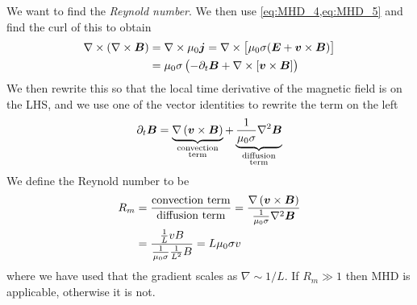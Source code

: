 We want to find the \emph{Reynold number}. We then use \cref{eq:MHD_4,eq:MHD_5} and find the curl of this to obtain
\begin{align*}
    \nabla\times\left(\nabla\times\boldsymbol{B}\right)&=\nabla\times\mu_0\boldsymbol{j}=\nabla\times\left[\mu_0\sigma(\boldsymbol{E}+\boldsymbol{v}\times\boldsymbol{B})\right]\\
    &=\mu_0\sigma\left(-\partial_{t}\boldsymbol{B}+\nabla\times\left[\boldsymbol{v}\times\boldsymbol{B}\right]\right)
\end{align*}
We then rewrite this so that the local time derivative of the magnetic field is on the LHS, and we use one of the vector identities to rewrite the term on the left
\begin{equation*}
    \partial_{t}\boldsymbol{B}=\underbrace{\nabla\left(\boldsymbol{v}\times\boldsymbol{B}\right)}_{\substack{\textnormal{convection}\\ \textnormal{term}}}+\underbrace{\frac{1}{\mu_0\sigma}\nabla^2\boldsymbol{B}}_{\substack{\textnormal{diffusion}\\ \textnormal{term}}}
\end{equation*}
We define the Reynold number to be
\begin{align*}
    R_m&=\frac{\textnormal{convection term}}{\textnormal{diffusion term}}=\frac{\nabla\left(\boldsymbol{v}\times\boldsymbol{B}\right)}{\frac{1}{\mu_0\sigma}\nabla^2\boldsymbol{B}}\\
    &=\frac{\frac{1}{L}vB}{\frac{1}{\mu_0\sigma}\frac{1}{L^2}B}=L\mu_0\sigma v
\end{align*}
where we have used that the gradient scales as \(\nabla\sim 1/L\). If \(R_m\gg 1\) then MHD is applicable, otherwise it is not.
